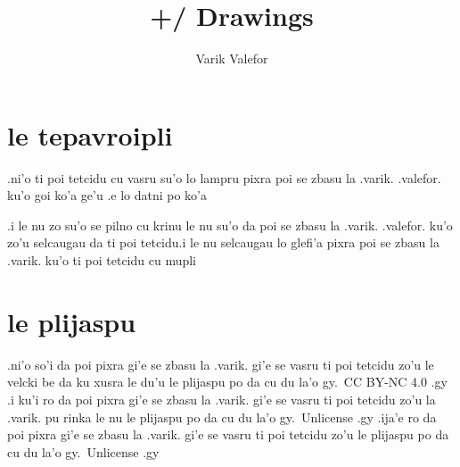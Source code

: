 \documentclass{report}
\title{+/ Drawings}
\author{Varik Valefor}
\begin{document}
\maketitle{}
\tableofcontents{}
\chapter{le tepavroipli}
.ni'o ti poi tetcidu cu vasru su'o lo lampru pixra poi se zbasu la .varik. .valefor. ku'o goi ko'a ge'u .e lo datni po ko'a

.i le nu zo su'o se pilno cu krinu le nu su'o da poi se zbasu la .varik. .valefor. ku'o zo'u selcaugau da ti poi tetcidu\@  .i le nu selcaugau lo glefi'a pixra poi se zbasu la .varik. ku'o ti poi tetcidu cu mupli
\chapter{le plijaspu}
.ni'o so'i da poi pixra gi'e se zbasu la .varik. gi'e se vasru ti poi tetcidu zo'u le velcki be da ku xusra le du'u le plijaspu po da cu du la'o gy.\ CC BY-NC 4.0 .gy  .i ku'i ro da poi pixra gi'e se zbasu la .varik. gi'e se vasru ti poi tetcidu zo'u la .varik. pu rinka le nu le plijaspu po da cu du la'o gy.\ Unlicense .gy  .ija'e ro da poi pixra gi'e se zbasu la .varik. gi'e se vasru ti poi tetcidu zo'u le plijaspu po da cu du la'o gy.\ Unlicense .gy
\end{document}
